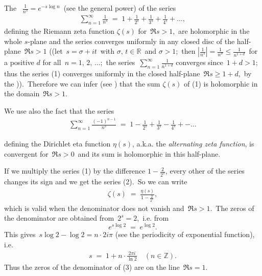 \documentclass[12pt]{article}
\theoremstyle{definition}
\begin{document}
The \, $\frac{1}{n^s} = e^{-s\log{n}}$\, (see the general power) of the series
\begin{align}
\sum_{n=1}^\infty\frac{1}{n^s} \;=\;
 1+\frac{1}{2^s}+\frac{1}{3^s}+\frac{1}{4^s}+\ldots,
\end{align}
defining the Riemann zeta function $\zeta(s)$ for\, 
$\Re{s} > 1$,\, are holomorphic in the whole $s$-plane and the 
series converges uniformly in any closed disc of the 
half-plane\, $\Re{s} > 1$ ((let\, $s = \sigma+it$\, with 
$\sigma,\, t\in\mathbb{R}$\, and $\sigma > 1$;\, 
then $|\frac{1}{n^s}| = \frac{1}{n^\sigma} \le \frac{1}{n^{1+d}}$\,
for a positive $d$ for all\, $n = 1,\,2,\,\ldots$;\, 
the series\, $\sum_{n=1}^\infty\frac{1}{n^{1+d}}$ converges 
since\, $1\!+\!d > 1$;\, thus the series (1) converges uniformly 
in the closed half-plane\, $\Re{s} \ge 1\!+\!d$,\, by the 
)).\, 
Therefore we can infer (see 
) 
that the sum $\zeta(s)$ of (1) is holomorphic in the domain\, 
$\Re{s} > 1$.

We use also the fact that the series
\begin{align}
\sum_{n=1}^\infty\frac{(-1)^{n-1}}{n^s} \;=\;
 1-\frac{1}{2^s}+\frac{1}{3^s}-\frac{1}{4^s}+-\ldots
\end{align}

defining the Dirichlet eta function $\eta(s)$, a.k.a. the {\it alternating zeta function}, is convergent for\, 
$\Re{s} > 0$\, and its sum is holomorphic in this half-plane.


If we multiply the series (1) by the difference 
$\displaystyle 1\!-\!\frac{2}{2^s}$, every other  of the series changes its sign and we get the series (2).\, So we can write
\begin{align}
\zeta(s) \;=\; \frac{\eta(s)}{1-\frac{2}{2^s}},
\end{align}
which is valid when the denominator does not vanish and\, $\Re{s} > 1$.\, The zeros of the denominator are obtained from\, $2^s = 2$,\, i.e. from
$$e^{s\log{2}} \;=\; e^{\log{2}}.$$
This gives\, $s\log{2}-\log{2} = n\cdot2i\pi$ (see the periodicity of exponential function), i.e.
\begin{align}
s \;=\; 1\!+\!n\!\cdot\!\frac{2\pi i}{\ln{2}}\quad(n\in\mathbb{Z}).
\end{align}
Thus the zeros of the denominator of (3) are on the line \,$\Re{s} = 1$.
\end{document}
